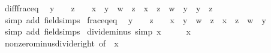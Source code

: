 \begin{isabellebody}
\endisatagproof
{\isafoldproof}%
%
\isadelimproof
\isanewline
%
\endisadelimproof
\isanewline
{}\isamarkupfalse%
\ diff{\isacharunderscore}{\kern0pt}frac{\isacharunderscore}{\kern0pt}eq{\isacharcolon}{\kern0pt}\isanewline
\ \ {\isachardoublequoteopen}y\ {\isasymnoteq}\ {}\ {\isasymLongrightarrow}\ z\ {\isasymnoteq}\ {}\ {\isasymLongrightarrow}\ x\ {\isacharslash}{\kern0pt}\ y\ {\isacharminus}{\kern0pt}\ w\ {\isacharslash}{\kern0pt}\ z\ {\isacharequal}{\kern0pt}\ {\isacharparenleft}{\kern0pt}x\ {\isacharasterisk}{\kern0pt}\ z\ {\isacharminus}{\kern0pt}\ w\ {\isacharasterisk}{\kern0pt}\ y{\isacharparenright}{\kern0pt}\ {\isacharslash}{\kern0pt}\ {\isacharparenleft}{\kern0pt}y\ {\isacharasterisk}{\kern0pt}\ z{\isacharparenright}{\kern0pt}{\isachardoublequoteclose}\isanewline
%
\isadelimproof
\ \ %
\endisadelimproof
%
\isatagproof
{}\isamarkupfalse%
\ {\isacharparenleft}{\kern0pt}simp\ add{\isacharcolon}{\kern0pt}\ field{\isacharunderscore}{\kern0pt}simps{\isacharparenright}{\kern0pt}%
\endisatagproof
{\isafoldproof}%
%
\isadelimproof
\isanewline
%
\endisadelimproof
\isanewline
{}\isamarkupfalse%
\ frac{\isacharunderscore}{\kern0pt}eq{\isacharunderscore}{\kern0pt}eq{\isacharcolon}{\kern0pt}\isanewline
\ \ {\isachardoublequoteopen}y\ {\isasymnoteq}\ {}\ {\isasymLongrightarrow}\ z\ {\isasymnoteq}\ {}\ {\isasymLongrightarrow}\ {\isacharparenleft}{\kern0pt}x\ {\isacharslash}{\kern0pt}\ y\ {\isacharequal}{\kern0pt}\ w\ {\isacharslash}{\kern0pt}\ z{\isacharparenright}{\kern0pt}\ {\isacharequal}{\kern0pt}\ {\isacharparenleft}{\kern0pt}x\ {\isacharasterisk}{\kern0pt}\ z\ {\isacharequal}{\kern0pt}\ w\ {\isacharasterisk}{\kern0pt}\ y{\isacharparenright}{\kern0pt}{\isachardoublequoteclose}\isanewline
%
\isadelimproof
\ \ %
\endisadelimproof
%
\isatagproof
{}\isamarkupfalse%
\ {\isacharparenleft}{\kern0pt}simp\ add{\isacharcolon}{\kern0pt}\ field{\isacharunderscore}{\kern0pt}simps{\isacharparenright}{\kern0pt}%
\endisatagproof
{\isafoldproof}%
%
\isadelimproof
\isanewline
%
\endisadelimproof
\isanewline
{}\isamarkupfalse%
\ divide{\isacharunderscore}{\kern0pt}minus{}\ {\isacharbrackleft}{\kern0pt}simp{\isacharbrackright}{\kern0pt}{\isacharcolon}{\kern0pt}\ {\isachardoublequoteopen}x\ {\isacharslash}{\kern0pt}\ {\isacharminus}{\kern0pt}\ {}\ {\isacharequal}{\kern0pt}\ {\isacharminus}{\kern0pt}\ x{\isachardoublequoteclose}\isanewline
%
\isadelimproof
\ \ %
\endisadelimproof
%
\isatagproof
{}\isamarkupfalse%
\ nonzero{\isacharunderscore}{\kern0pt}minus{\isacharunderscore}{\kern0pt}divide{\isacharunderscore}{\kern0pt}right\ {\isacharbrackleft}{\kern0pt}of\ {\isachardoublequoteopen}{}{\isachardoublequoteclose}\ x{\isacharbrackright}{\kern0pt}\ \isamarkupfalse%

\end{isabellebody}
